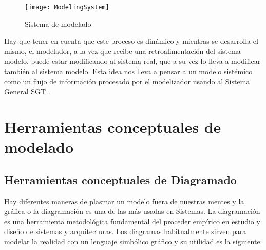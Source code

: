 \begin{figure}[h]
  \centering
  \texttt{[image: ModelingSystem]}
  \caption{Sistema de modelado}
  \centering
  \label{fig:ModelingSystem} %
\end{figure}

Hay que tener en cuenta que este proceso es dinámico y mientras se desarrolla el mismo, el modelador, a la vez que recibe una retroalimentación del sistema modelo, puede estar modificando al sistema real, que a su vez lo lleva a modificar también al sistema modelo. Esta idea nos lleva a pensar a un modelo sistémico como un flujo de información procesado por el modelizador usando al Sistema General SGT \cite{Sarabia-1995}.

\section{Herramientas conceptuales de modelado}

\subsection{Herramientas conceptuales de Diagramado}

Hay diferentes maneras de plasmar un modelo fuera de nuestras mentes y la gráfica o la diagramación es una de las más usadas en Sistemas. La diagramación es una herramienta metodológica fundamental del proceder empírico en estudio y diseño de sistemas y arquitecturas. Los diagramas habitualmente sirven para modelar la realidad con un lenguaje simbólico gráfico y su utilidad es la siguiente:

